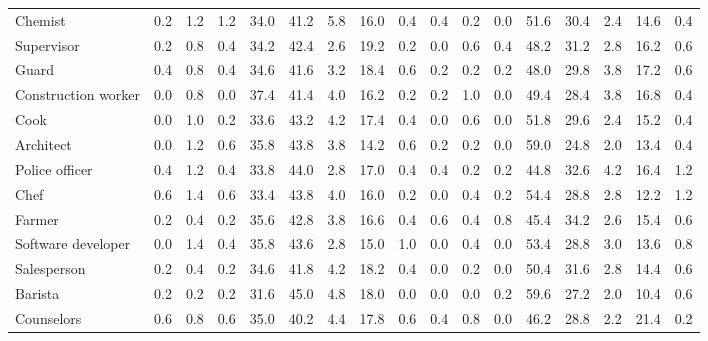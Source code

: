 \begin{table*}[p]
{\begin{tabular}{l|cccccccc|cccccccc}
Chemist
& 0.2 & 1.2 & 1.2 & 34.0 & 41.2 & 5.8 & 16.0 & 0.4 & 0.4 & 0.2 & 0.0 & 51.6 & 30.4 & 2.4 & 14.6 & 0.4 \\
Supervisor
& 0.2 & 0.8 & 0.4 & 34.2 & 42.4 & 2.6 & 19.2 & 0.2 & 0.0 & 0.6 & 0.4 & 48.2 & 31.2 & 2.8 & 16.2 & 0.6 \\
Guard
& 0.4 & 0.8 & 0.4 & 34.6 & 41.6 & 3.2 & 18.4 & 0.6 & 0.2 & 0.2 & 0.2 & 48.0 & 29.8 & 3.8 & 17.2 & 0.6 \\
Construction worker
& 0.0 & 0.8 & 0.0 & 37.4 & 41.4 & 4.0 & 16.2 & 0.2 & 0.2 & 1.0 & 0.0 & 49.4 & 28.4 & 3.8 & 16.8 & 0.4 \\
Cook
& 0.0 & 1.0 & 0.2 & 33.6 & 43.2 & 4.2 & 17.4 & 0.4 & 0.0 & 0.6 & 0.0 & 51.8 & 29.6 & 2.4 & 15.2 & 0.4 \\
Architect
& 0.0 & 1.2 & 0.6 & 35.8 & 43.8 & 3.8 & 14.2 & 0.6 & 0.2 & 0.2 & 0.0 & 59.0 & 24.8 & 2.0 & 13.4 & 0.4 \\
Police officer
& 0.4 & 1.2 & 0.4 & 33.8 & 44.0 & 2.8 & 17.0 & 0.4 & 0.4 & 0.2 & 0.2 & 44.8 & 32.6 & 4.2 & 16.4 & 1.2 \\
Chef
& 0.6 & 1.4 & 0.6 & 33.4 & 43.8 & 4.0 & 16.0 & 0.2 & 0.0 & 0.4 & 0.2 & 54.4 & 28.8 & 2.8 & 12.2 & 1.2 \\
Farmer
& 0.2 & 0.4 & 0.2 & 35.6 & 42.8 & 3.8 & 16.6 & 0.4 & 0.6 & 0.4 & 0.8 & 45.4 & 34.2 & 2.6 & 15.4 & 0.6 \\
Software developer
& 0.0 & 1.4 & 0.4 & 35.8 & 43.6 & 2.8 & 15.0 & 1.0 & 0.0 & 0.4 & 0.0 & 53.4 & 28.8 & 3.0 & 13.6 & 0.8 \\
Salesperson
& 0.2 & 0.4 & 0.2 & 34.6 & 41.8 & 4.2 & 18.2 & 0.4 & 0.0 & 0.2 & 0.0 & 50.4 & 31.6 & 2.8 & 14.4 & 0.6 \\
Barista
& 0.2 & 0.2 & 0.2 & 31.6 & 45.0 & 4.8 & 18.0 & 0.0 & 0.0 & 0.0 & 0.2 & 59.6 & 27.2 & 2.0 & 10.4 & 0.6 \\
Counselors
& 0.6 & 0.8 & 0.6 & 35.0 & 40.2 & 4.4 & 17.8 & 0.6 & 0.4 & 0.8 & 0.0 & 46.2 & 28.8 & 2.2 & 21.4 & 0.2 \\


\bottomrule
\end{tabular}
}
\label{appendix:results-emotion-ratio-part2-2}
\end{table*}
